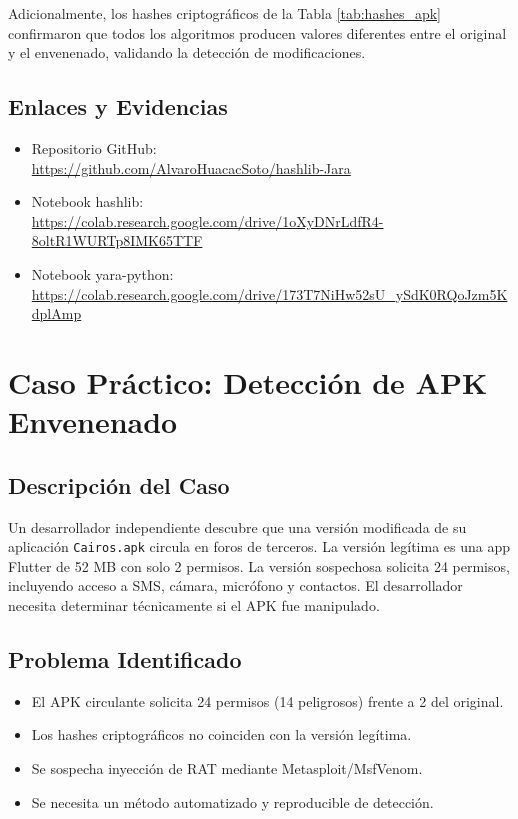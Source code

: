 \documentclass[12pt,a4paper]{article}
\begin{document}
Adicionalmente, los hashes criptográficos de la Tabla
\ref{tab:hashes_apk} confirmaron que todos los algoritmos producen
valores diferentes entre el original y el envenenado, validando la
detección de modificaciones.

\subsection{Enlaces y Evidencias}

\begin{itemize}
\item Repositorio GitHub:\\ \url{https://github.com/AlvaroHuacacSoto/hashlib-Jara}
\item Notebook hashlib:\\ \url{https://colab.research.google.com/drive/1oXyDNrLdfR4-8oltR1WURTp8IMK65TTF}
\item Notebook yara-python:\\ \url{https://colab.research.google.com/drive/173T7NiHw52sU_ySdK0RQoJzm5KdplAmp}
\end{itemize}

\section{Caso Práctico: Detección de APK Envenenado}

\subsection{Descripción del Caso}

Un desarrollador independiente descubre que una versión modificada de su
aplicación \texttt{Cairos.apk} circula en foros de terceros. La versión
legítima es una app Flutter de 52 MB con solo 2 permisos. La versión
sospechosa solicita 24 permisos, incluyendo acceso a SMS, cámara,
micrófono y contactos. El desarrollador necesita determinar técnicamente
si el APK fue manipulado.

\subsection{Problema Identificado}

\begin{itemize}
\item El APK circulante solicita 24 permisos (14 peligrosos) frente a 2 del original.
\item Los hashes criptográficos no coinciden con la versión legítima.
\item Se sospecha inyección de RAT mediante Metasploit/MsfVenom.
\item Se necesita un método automatizado y reproducible de detección.
\end{itemize}
\end{document}
